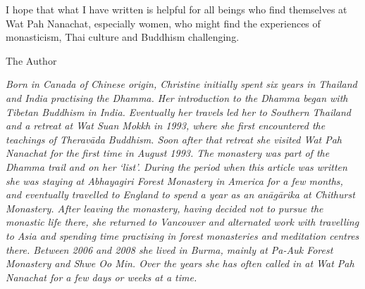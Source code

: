 I hope that what I have written is helpful for all beings who find
themselves at Wat Pah Nanachat, especially women, who might find the
experiences of monasticism, Thai culture and Buddhism challenging. 

The Author

\emph{Born in Canada of Chinese origin, Christine initially spent six
years in Thailand and India practising the Dhamma. Her introduction to
the Dhamma began with Tibetan Buddhism in India. Eventually her travels
led her to Southern Thailand and a retreat at Wat Suan Mokkh in 1993, 
where she first encountered the teachings of Theravāda Buddhism. Soon
after that retreat she visited Wat Pah Nanachat for the first time in
August 1993. The monastery was part of the Dhamma trail and on her
`list'. During the period when this article was written she was staying
at Abhayagiri Forest Monastery in America for a few months, and
eventually travelled to England to spend a year as an anāgārika at
Chithurst Monastery. After leaving the monastery, having decided not to
pursue the monastic life there, she returned to Vancouver and alternated
work with travelling to Asia and spending time practising in forest
monasteries and meditation centres there. Between 2006 and 2008 she
lived in Burma, mainly at Pa-Auk Forest Monastery and Shwe Oo Min. Over
the years she has often called in at Wat Pah Nanachat for a few days or
weeks at a time.}

